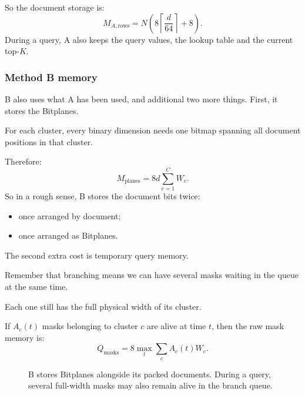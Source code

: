 So the document storage is:
\[
M_{A,\text{rows}}=N\left(8\left\lceil\frac d{64}\right\rceil+8\right).
\]
During a query, A also keeps the query values, the lookup table and the current top-$K$.

\subsubsection{Method B memory}
B also uses what A has been used, and additional two more things.
First, it stores the Bitplanes.

For each cluster, every binary dimension needs one bitmap spanning all document positions in that cluster.

Therefore:
\[
M_{\text{planes}}=8d\sum_{c=1}^{C}W_c.
\]
So in a rough sense, B stores the document bits twice:
\begin{itemize}\setlength{\itemsep}{1pt}
\item once arranged by document;
\item once arranged as Bitplanes.
\end{itemize}
The second extra cost is temporary query memory.

Remember that branching means we can have several masks waiting in the queue at the same time.

Each one still has the full physical width of its cluster.

If $A_c(t)$ masks belonging to cluster $c$ are alive at time $t$, then the raw mask memory is:
\[
Q_{\text{masks}}=8\max_t\sum_c A_c(t)W_c.
\]

\begin{figure}[htbp]\centering
{}
\caption{B stores Bitplanes alongside its packed documents. During a query, several full-width masks may also remain alive in the branch queue.}
\end{figure}

